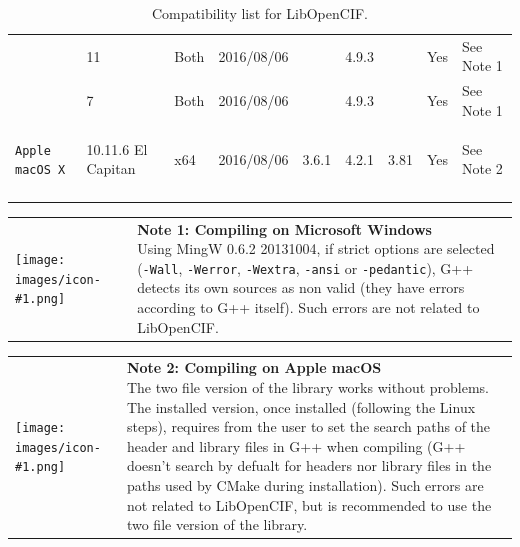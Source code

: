 \documentclass[11pt,twoside,openany,x11names,svgnames]{memoir}
\makeatletter
\newcommand{\IconNote}[3]
{
	\begin{table}[ht]
	\begin{tabular}{ lm{\dimexpr\textwidth-8\tabcolsep-\wd0}@{}}
		\toprule
		\texttt{[image: images/icon-\#1.png]}
		&
		\parbox[t]{155mm}{
		\textbf{#2} \\
		#3
		}
	\end{tabular}
\end{table}
}
\makeatother
\begin{document}
{\begin{longtable}{| >{\bfseries}p{3cm} | p{2.6cm} | p{1cm} | p{1.5cm} | p{1cm} | p{0.7cm} | p{0.7cm} | p{0.8cm} | p{1.5cm} |}
	\multirow{2}{*}{\texttt{Microsoft Windows}}   & 11                             & Both   & 2016/08/06  &          & 4.9.3 &       & Yes   & See Note 1 \\

	                                              \cline{2-8}
	                                              & 7                              & Both   & 2016/08/06  &          & 4.9.3 &       & Yes   & See Note 1 \\
	                                              
	\hline
	
	\texttt{Apple macOS X}                        & 10.11.6 El Capitan             & x64    & 2016/08/06  & 3.6.1    & 4.2.1 & 3.81  & Yes & See Note 2 \\
	
	\hline
\caption{Compatibility list for LibOpenCIF.}
\label{tab:Compatibility-list-for-LibOpenCIF}
\end{longtable}
}

\IconNote
	{warning}
	{Note 1: Compiling on Microsoft Windows}
	{Using MingW 0.6.2 20131004, if strict options are selected (\texttt{-Wall}, \texttt{-Werror}, \texttt{-Wextra}, \texttt{-ansi} or \texttt{-pedantic}), G++ detects its own sources as non valid (they have errors according to G++ itself). Such errors are not related to LibOpenCIF.}

\IconNote
	{warning}
	{Note 2: Compiling on Apple macOS}
	{The two file version of the library works without problems. The installed version, once installed (following the Linux steps), requires from the user to set the search paths of the header and library files in G++ when compiling (G++ doesn't search by defualt for headers nor library files in the paths used by CMake during installation). Such errors are not related to LibOpenCIF, but is recommended to use the two file version of the library.}


\cleartoverso


\enlargethispage{3\baselineskip}
\thispagestyle{empty}
\pagecolor[HTML]{0E0407}

\begin{center}
\begin{minipage}{.8\textwidth}
\color{Cornsilk}\Large\bfseries

\end{minipage}
\end{center}
\end{document}
